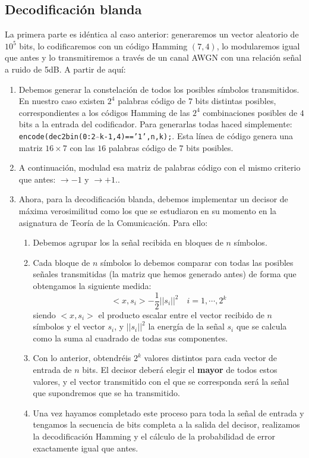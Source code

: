 \documentclass[es,practica,12pt]{uah}
\begin{document}
\subsection{Decodificación blanda}

La primera parte es idéntica al caso anterior: generaremos un vector aleatorio de $10^5$ bits, lo codificaremos con un código Hamming $(7,4)$, lo modularemos igual que antes y lo transmitiremos a través de un canal AWGN con una relación señal a ruido de 5dB. A partir de aquí:

\begin{enumerate}
	\item Debemos generar la constelación de todos los posibles símbolos transmitidos. En nuestro caso existen $2^4$ palabras código de $7$ bits distintas posibles, correspondientes a los códigos Hamming de las $2^4$ combinaciones posibles de $4$ bits a la entrada del codificador. Para generarlas todas haced simplemente: \texttt{encode(dec2bin(0:2$\hat{\,\,\,}$k-1,4)=='1',n,k);}. Esta línea de código genera una matriz $16\times 7$ con las $16$ palabras código de $7$ bits posibles. 
	\item A continuación, modulad esa matriz de palabras código con el mismo criterio que antes:  $\rightarrow -1$ y  $\rightarrow +1$..
	\item Ahora, para la decodificación blanda, debemos implementar un decisor de máxima verosimilitud como los que se estudiaron en su momento en la asignatura de Teoría de la Comunicación. Para ello:
	\begin{enumerate}
		\item Debemos agrupar los la señal recibida en bloques de $n$ símbolos. 
		\item Cada bloque de $n$ símbolos lo debemos comparar con todas las posibles señales transmitidas (la matriz que hemos generado antes) de forma que obtengamos la siguiente medida:
		\begin{displaymath}
			<x, s_i> - \frac{1}{2} ||s_i||^2	\quad i=1, \cdots, 2^k
		\end{displaymath}
		siendo $<x, s_i>$ el producto escalar entre el vector recibido de $n$ símbolos y el vector $s_i$, y $||s_i||^2$ la energía de la señal $s_i$ que se calcula como la suma al cuadrado de todas sus componentes.
		\item Con lo anterior, obtendréis $2^k$ valores distintos para cada vector de entrada de $n$ bits. El decisor deberá elegir el {\bf mayor} de todos estos valores, y el vector transmitido con el que se corresponda será la señal que supondremos que se ha transmitido. 
		\item Una vez hayamos completado este proceso para toda la señal de entrada y tengamos la secuencia de bits completa a la salida del decisor, realizamos la decodificación Hamming y el cálculo de la probabilidad de error exactamente igual que antes. 
	\end{enumerate}
\end{enumerate}
\end{document}

